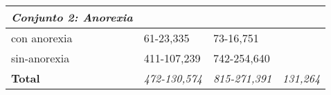 \begin{table}[!hbt]
\begin{center}
\begin{tabular}{llll}
\rowcolor[HTML]{EFEFEF} 
\textit{Conjunto 2: Anorexia}       & \multicolumn{1}{c}{\cellcolor[HTML]{EFEFEF}} & \multicolumn{1}{c}{\cellcolor[HTML]{EFEFEF}} &                                                              \\ \hline
\rowcolor[HTML]{FFFFFF} 
con anorexia                        & 61-23,335                                    & 73-16,751                                    &                                                              \\ \hline
\rowcolor[HTML]{FFFFFF} 
sin-anorexia                        & 411-107,239                                  & 742-254,640                                  &                                                              \\ \hline
\rowcolor[HTML]{FFFFFF} 
\textbf{Total}                      & \textit{472-130,574}                         & \textit{815-271,391}                         & \multicolumn{1}{c}{\cellcolor[HTML]{FFFFFF}\textit{131,264}} \\ \hline
\end{tabular}

\end{center}

\end{table}
